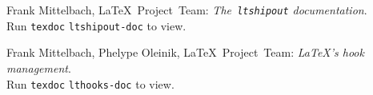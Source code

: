 \documentclass{ltnews}
\providecommand\Dash {\unskip \textemdash}
\begin{document}

\begin{thebibliography}{9}


 Frank Mittelbach, \LaTeX{}~Project~Team:
  \emph{The~\texttt{\upshape ltshipout} documentation}.\\
  Run \texttt{texdoc} \texttt{ltshipout-doc} to view.

 Frank Mittelbach, Phelype Oleinik, \LaTeX{}~Project~Team:
 \emph{\LaTeX's hook management}.\\
 Run \texttt{texdoc} \texttt{lthooks-doc} to view.



%
%
%
%
%
\end{thebibliography}
\end{document}
